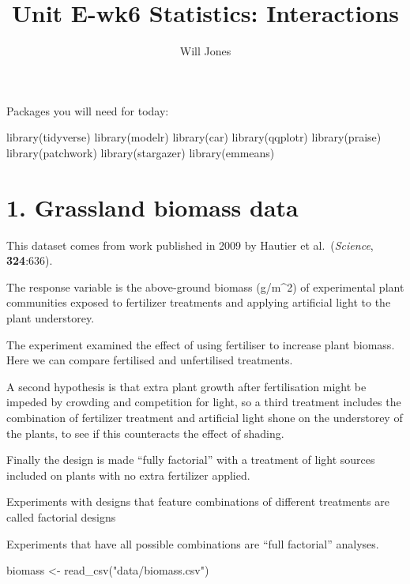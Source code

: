 \documentclass[
]{article}
\title{Unit E-wk6 Statistics: Interactions}
\author{Will Jones}
\date{}
\newenvironment{Shaded}{\begin{snugshade}}{\end{snugshade}}
\newcommand{\FunctionTok}[1]{\textcolor[rgb]{0.00,0.00,0.00}{#1}}
\newcommand{\NormalTok}[1]{#1}
\newcommand{\OtherTok}[1]{\textcolor[rgb]{0.56,0.35,0.01}{#1}}
\newcommand{\StringTok}[1]{\textcolor[rgb]{0.31,0.60,0.02}{#1}}
\begin{document}
\maketitle

{
\setcounter{tocdepth}{2}
\tableofcontents
}
Packages you will need for today:

\begin{Shaded}
\begin{Highlighting}[]
\FunctionTok{library}\NormalTok{(tidyverse)}
\FunctionTok{library}\NormalTok{(modelr)}
\FunctionTok{library}\NormalTok{(car)}
\FunctionTok{library}\NormalTok{(qqplotr)}
\FunctionTok{library}\NormalTok{(praise)}
\FunctionTok{library}\NormalTok{(patchwork)}
\FunctionTok{library}\NormalTok{(stargazer)}
\FunctionTok{library}\NormalTok{(emmeans)}
\end{Highlighting}
\end{Shaded}

\hypertarget{grassland-biomass-data}{%
\section{1. Grassland biomass data}\label{grassland-biomass-data}}

This dataset comes from work published in 2009 by Hautier et
al.~(\emph{Science}, \textbf{324}:636).

The response variable is the above-ground biomass (g/m\^{}2) of
experimental plant communities exposed to fertilizer treatments and
applying artificial light to the plant understorey.

The experiment examined the effect of using fertiliser to increase plant
biomass. Here we can compare fertilised and unfertilised treatments.

A second hypothesis is that extra plant growth after fertilisation might
be impeded by crowding and competition for light, so a third treatment
includes the combination of fertilizer treatment and artificial light
shone on the understorey of the plants, to see if this counteracts the
effect of shading.

Finally the design is made ``fully factorial'' with a treatment of light
sources included on plants with no extra fertilizer applied.

Experiments with designs that feature combinations of different
treatments are called factorial designs

Experiments that have all possible combinations are ``full factorial''
analyses.

\begin{Shaded}
\begin{Highlighting}[]
\NormalTok{biomass }\OtherTok{\textless{}{-}} \FunctionTok{read\_csv}\NormalTok{(}\StringTok{"data/biomass.csv"}\NormalTok{)}
\end{Highlighting}
\end{Shaded}
\end{document}
